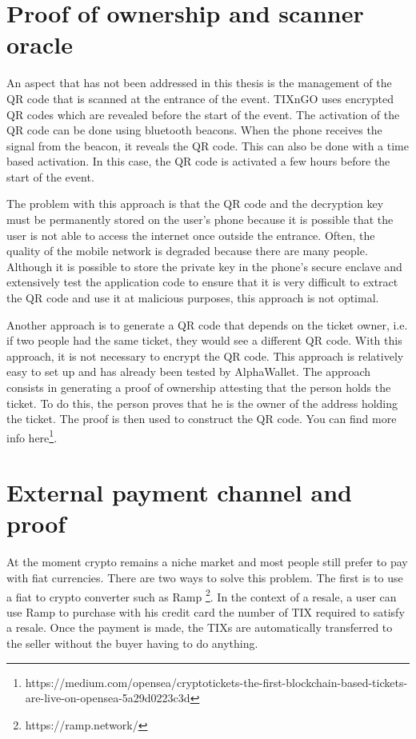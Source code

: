 \documentclass[a4paper,11pt,oneside]{report}
\begin{document}
\section{Proof of ownership and scanner oracle}
An aspect that has not been addressed in this thesis is the management of the QR code that is scanned at the entrance of the event. TIXnGO uses encrypted QR codes which are revealed before the start of the event. The activation of the QR code can be done using bluetooth beacons. When the phone receives the signal from the beacon, it reveals the QR code. This can also be done with a time based activation. In this case, the QR code is activated a few hours before the start of the event.

The problem with this approach is that the QR code and the decryption key must be permanently stored on the user's phone because it is possible that the user is not able to access the internet once outside the entrance. Often, the quality of the mobile network is degraded because there are many people. Although it is possible to store the private key in the phone's secure enclave and extensively test the application code to ensure that it is very difficult to extract the QR code and use it at malicious purposes, this approach is not optimal.

Another approach is to generate a QR code that depends on the ticket owner, i.e. if two people had the same ticket, they would see a different QR code. With this approach, it is not necessary to encrypt the QR code. This approach is relatively easy to set up and has already been tested by AlphaWallet. The approach consists in generating a proof of ownership attesting that the person holds the ticket. To do this, the person proves that he is the owner of the address holding the ticket. The proof is then used to construct the QR code. You can find more info here\footnote{https://medium.com/opensea/cryptotickets-the-first-blockchain-based-tickets-are-live-on-opensea-5a29d0223c3d}.

\section{External payment channel and proof}
At the moment crypto remains a niche market and most people still prefer to pay with fiat currencies. There are two ways to solve this problem. The first is to use a fiat to crypto converter such as Ramp \footnote{https://ramp.network/}. In the context of a resale, a user can use Ramp to purchase with his credit card the number of TIX required to satisfy a resale. Once the payment is made, the TIXs are automatically transferred to the seller without the buyer having to do anything.
\end{document}
